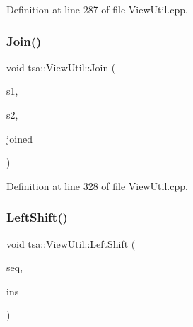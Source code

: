 Definition at line 287 of file View\+Util.\+cpp.

\mbox{\label{classtsa_1_1_view_util_a0f75acac9a11c4eaeda04d5256fad5ed}} 
\subsubsection{\texorpdfstring{Join()}{Join()}\hspace{0.1cm}{\footnotesize\ttfamily [3/3]}}
{\footnotesize\ttfamily void tsa\+::\+View\+Util\+::\+Join (\begin{DoxyParamCaption}\item[{\hyperlink{namespacetsa_ac599574bcc094eda25613724b8f3ca9e}{Seq\+View\+Double} \&}]{s1,  }\item[{\hyperlink{namespacetsa_ac599574bcc094eda25613724b8f3ca9e}{Seq\+View\+Double} \&}]{s2,  }\item[{\hyperlink{namespacetsa_ac599574bcc094eda25613724b8f3ca9e}{Seq\+View\+Double} \&}]{joined }\end{DoxyParamCaption})\hspace{0.3cm}{\ttfamily [static]}}



Definition at line 328 of file View\+Util.\+cpp.

\mbox{\label{classtsa_1_1_view_util_a2b338186c5f8662d0b3c05706c35d54a}} 
\subsubsection{\texorpdfstring{Left\+Shift()}{LeftShift()}}
{\footnotesize\ttfamily void tsa\+::\+View\+Util\+::\+Left\+Shift (\begin{DoxyParamCaption}\item[{\hyperlink{namespacetsa_ac599574bcc094eda25613724b8f3ca9e}{Seq\+View\+Double} \&}]{seq,  }\item[{\hyperlink{namespacetsa_ac599574bcc094eda25613724b8f3ca9e}{Seq\+View\+Double} \&}]{ins }\end{DoxyParamCaption})\hspace{0.3cm}{\ttfamily [static]}}



